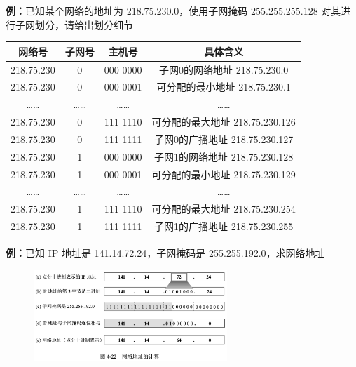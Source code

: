 \documentclass[cs4size,a4paper,10pt]{ctexart}
\begin{document}
	\textbf{例：}已知某个网络的地址为 218.75.230.0，使用子网掩码 255.255.255.128 对其进行子网划分，请给出划分细节
	\begin{table}[H]
		\centering
		\begin{tabular}{|c|c|c|c|}
		\hline
		网络号        & 子网号 & 主机号      & 具体含义                    \\ \hline
		218.75.230 & 0   & 000 0000 & 子网0的网络地址 218.75.230.0   \\ \hline
		218.75.230 & 0   & 000 0001 & 可分配的最小地址 218.75.230.1   \\ \hline
		……         & ……  & ……       & ……                      \\ \hline
		218.75.230 & 0   & 111 1110 & 可分配的最大地址 218.75.230.126 \\ \hline
		218.75.230 & 0   & 111 1111 & 子网0的广播地址 218.75.230.127 \\ \hline
		218.75.230 & 1   & 000 0000 & 子网1的网络地址 218.75.230.128 \\ \hline
		218.75.230 & 1   & 000 0001 & 可分配的最小地址 218.75.230.129 \\ \hline
		……         & ……  & ……       & ……                      \\ \hline
		218.75.230 & 1   & 111 1110 & 可分配的最大地址 218.75.230.254 \\ \hline
		218.75.230 & 1   & 111 1111 & 子网1的广播地址 218.75.230.255 \\ \hline
		\end{tabular}
	\end{table}

	\textbf{例：}已知 IP 地址是 141.14.72.24，子网掩码是 255.255.192.0，求网络地址
	\begin{figure}[H]
		\centering
		\includegraphics[width=0.65\textwidth]{img/4.22}
	\end{figure}
\end{document}
